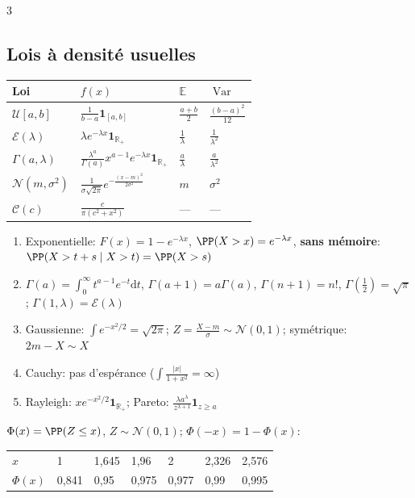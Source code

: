 \documentclass[12pt, a4paper]{article}
\newcommand{\dd}{\mathrm{d}}
\newcommand{\E}{\mathbb{E}}
\newcommand{\R}{\mathbb{R}}
\newcommand{\Var}{\operatorname{Var}}
\newcommand{\ind}{\mathbf{1}}
\begin{document}
\begin{multicols*}{3}
	\subsection{Lois à densité usuelles}
	\begin{tabular}{|l|l|l|l|}
		\hline
		\textbf{Loi}             & $f(x)$                                            & $\E$ & $\Var$ \\
		\hline
		$\mathcal U[a,b]$        & $\frac1{b-a}\ind_{[a,b]}$                         & $\frac{a+b}2$ & $\frac{(b-a)^2}{12}$ \\
		$\mathcal E(\lambda)$    & $\lambda e^{-\lambda x}\ind_{\R_+}$               & $\frac1\lambda$ & $\frac1{\lambda^2}$ \\
		$\Gamma(a,\lambda)$      & $\frac{\lambda^a}{\Gamma(a)}x^{a-1}e^{-\lambda x}\ind_{\R_+}$ & $\frac a\lambda$ & $\frac a{\lambda^2}$ \\
		$\mathcal N(m,\sigma^2)$ & $\frac1{\sigma\sqrt{2\pi}}e^{-\frac{(x-m)^2}{2\sigma^2}}$ & $m$ & $\sigma^2$ \\
		$\mathcal C(c)$          & $\frac{c}{\pi(c^2+x^2)}$                          & --- & --- \\
		\hline
	\end{tabular}
	\begin{enumerate}[\roman*.]
		\item Exponentielle: $F(x)=1-e^{-\lambda x}$, $\PP(X>x)=e^{-\lambda x}$, \textbf{sans mémoire}: $\PP(X>t+s\mid X>t)=\PP(X>s)$
		\item $\Gamma(a)=\int_0^\infty t^{a-1}e^{-t}\dd t$, $\Gamma(a+1)=a\Gamma(a)$, $\Gamma(n+1)=n!$, $\Gamma(\frac12)=\sqrt\pi$; $\Gamma(1,\lambda)=\mathcal E(\lambda)$
		\item Gaussienne: $\int e^{-x^2/2}=\sqrt{2\pi}$; $Z=\frac{X-m}\sigma\sim\mathcal N(0,1)$; symétrique: $2m-X\sim X$
		\item Cauchy: pas d'espérance ($\int\frac{|x|}{1+x^2}=\infty$)
		\item Rayleigh: $xe^{-x^2/2}\ind_{\R_+}$; Pareto: $\frac{\lambda a^\lambda}{z^{\lambda+1}}\ind_{z\geq a}$
	\end{enumerate}
	$\Phi(x)=\PP(Z\leq x)$, $Z\sim\mathcal N(0,1)$; $\Phi(-x)=1-\Phi(x)$:

	\begin{tabular}{|l|l|l|l|l|l|l|}
		\hline
		$x$       & 1     & 1,645 & 1,96  & 2     & 2,326 & 2,576 \\
		$\Phi(x)$ & 0,841 & 0,95  & 0,975 & 0,977 & 0,99  & 0,995 \\
		\hline
	\end{tabular}


\end{multicols*}
\end{document}
